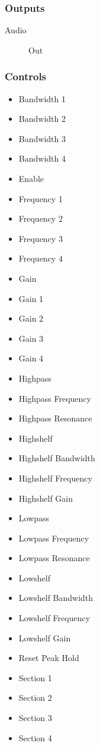 \subsubsection{Outputs}
\begin{description}
\item [Audio] Out
\end{description}

\subsubsection{Controls}
\begin{itemize}
\item Bandwidth 1
\item Bandwidth 2
\item Bandwidth 3
\item Bandwidth 4
\item Enable
\item Frequency 1
\item Frequency 2
\item Frequency 3
\item Frequency 4
\item Gain
\item Gain 1
\item Gain 2
\item Gain 3
\item Gain 4
\item Highpass
\item Highpass Frequency
\item Highpass Resonance
\item Highshelf
\item Highshelf Bandwidth
\item Highshelf Frequency
\item Highshelf Gain
\item Lowpass
\item Lowpass Frequency
\item Lowpass Resonance
\item Lowshelf
\item Lowshelf Bandwidth
\item Lowshelf Frequency
\item Lowshelf Gain
\item Reset Peak Hold
\item Section 1
\item Section 2
\item Section 3
\item Section 4
\end{itemize}

